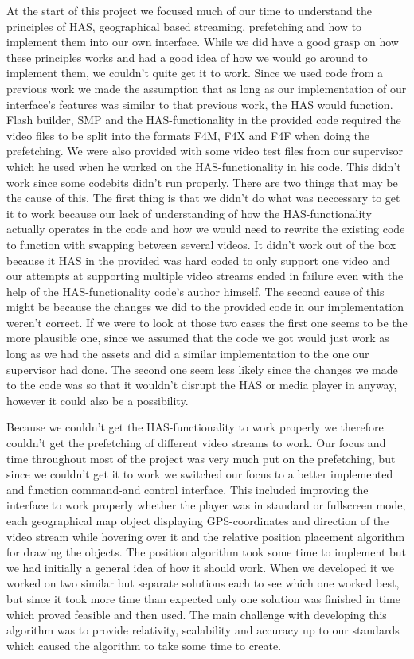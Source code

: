 \documentclass[9pt,a4paper]{acmproc}
\begin{document}
At the start of this project we focused much of our time to understand the principles of HAS, geographical based streaming, prefetching and how to implement them into our own interface. While we did have a good grasp on how these principles works and had a good idea of how we would go around to implement them, we couldn’t quite get it to work. Since we used code from a previous work we made the assumption that as long as our implementation of our interface’s features was similar to that previous work, the HAS would function. Flash builder, SMP and the HAS-functionality in the provided code required the video files to be split into the formats F4M, F4X and F4F when doing the prefetching. We were also provided with some video test files from our supervisor which he used when he worked on the HAS-functionality in his code. This didn’t work since some codebits didn’t run properly. There are two things that may be the cause of this. The first thing is that we didn’t do what was neccessary to get it to work because our lack of understanding of how the HAS-functionality actually operates in the code and how we would need to rewrite the existing code to function with swapping between several videos. It didn’t work out of the box because it HAS in the provided was hard coded to only support one video and our attempts at supporting multiple video streams ended in failure even with the help of the HAS-functionality code’s author himself. The second cause of this might be because the changes we did to the provided code in our implementation weren’t correct. If we were to look at those two cases the first one seems to be the more plausible one, since we assumed that the code we got would just work as long as we had the assets and did a similar implementation to the one our supervisor had done. The second one seem less likely since the changes we made to the code was so that it wouldn’t disrupt the HAS or media player in anyway, however it could also be a possibility. 

Because we couldn’t get the HAS-functionality to work properly we therefore couldn’t get the prefetching of different video streams to work. Our focus and time throughout most of the project was very much put on the prefetching, but since we couldn’t get it to work we switched our focus to a better implemented and function command-and control interface.
This included improving the interface to work properly whether the player was in standard or fullscreen mode, each geographical map object displaying GPS-coordinates and direction of the video stream while hovering over it and the relative position placement algorithm for drawing the objects. The position algorithm took some time to implement but we had initially a general idea of how it should work. When we developed it we worked on two similar but separate solutions each to see which one worked best, but since it took more time than expected only one solution was finished in time which proved feasible and then used. The main challenge with developing this algorithm was to provide relativity, scalability and accuracy up to our standards which caused the algorithm to take some time to create.
\end{document}
